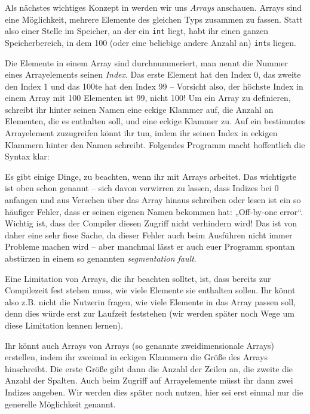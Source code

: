 
Als nächstes wichtiges Konzept in \Cpp werden wir uns \emph{Arrays} anschauen.
Arrays sind eine Möglichkeit, mehrere Elemente des gleichen Typs zusammen zu
fassen. Statt also einer Stelle im Speicher, an der ein \texttt{int} liegt,
habt ihr einen ganzen Speicherbereich, in dem 100 (oder eine beliebige andere
Anzahl an) \texttt{int}s liegen.

Die Elemente in einem Array sind durchnummeriert, man nennt die Nummer eines
Arrayelements seinen \emph{Index}. Das erste Element hat den Index 0, das
zweite den Index 1 und das 100te hat den Index 99 -- Vorsicht also, der höchste
Index in einem Array mit 100 Elementen ist 99, nicht 100! Um ein Array zu
definieren, schreibt ihr hinter seinen Namen eine eckige Klammer auf, die
Anzahl an Elementen, die es enthalten soll, und eine eckige Klammer zu. Auf ein
bestimmtes Arrayelement zuzugreifen könnt ihr tun, indem ihr seinen Index in
eckigen Klammern hinter den Namen schreibt. Folgendes Programm macht
hoffentlich die Syntax klar:


Es gibt einige Dinge, zu beachten, wenn ihr mit Arrays arbeitet. Das
wichtigste ist oben schon genannt -- sich davon verwirren zu lassen, dass
Indizes bei 0 anfangen und aus Versehen über das Array hinaus schreiben oder
lesen ist ein so häufiger Fehler, dass er seinen eigenen Namen bekommen hat:
„Off-by-one error“. Wichtig ist, dass der Compiler diesen Zugriff nicht
verhindern wird! Das ist von daher eine sehr fiese Sache, da dieser
Fehler auch beim Ausführen nicht immer Probleme machen wird -- aber manchmal
lässt er auch euer Programm spontan abstürzen in einem so genannten
\emph{segmentation fault}.

Eine Limitation von Arrays, die ihr beachten solltet, ist, dass bereits zur
Compilezeit fest stehen muss, wie viele Elemente sie enthalten sollen. Ihr
könnt also z.B. nicht die Nutzerin fragen, wie viele Elemente in das Array
passen soll, denn dies würde erst zur Laufzeit feststehen (wir werden später
noch Wege um diese Limitation kennen lernen).

Ihr könnt auch Arrays von Arrays (so genannte zweidimensionale Arrays)
erstellen, indem ihr zweimal in eckigen Klammern die Größe des Arrays
hinschreibt. Die erste Größe gibt dann die Anzahl der Zeilen an, die zweite die
Anzahl der Spalten. Auch beim Zugriff auf Arrayelemente müsst ihr dann zwei
Indizes angeben. Wir werden dies später noch nutzen, hier sei erst einmal nur
die generelle Möglichkeit genannt.

